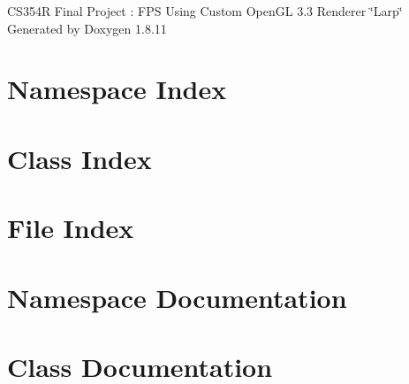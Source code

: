 \documentclass[twoside]{book}
\newcommand{\+}{\discretionary{\mbox{\scriptsize$\hookleftarrow$}}{}{}}
\newcommand{\clearemptydoublepage}{%
  \newpage{\pagestyle{empty}\cleardoublepage}%
}
\begin{document}
\hypersetup{pageanchor=false,
             bookmarksnumbered=true,
             pdfencoding=unicode
            }
\begin{titlepage}
\vspace*{7cm}
\begin{center}%
{\Large C\+S354R Final Project \+: F\+PS Using Custom Open\+GL 3.3 Renderer \char`\"{}\+Larp\char`\"{} }\\
\vspace*{1cm}
{\large Generated by Doxygen 1.8.11}\\
\end{center}
\end{titlepage}
\clearemptydoublepage
\tableofcontents
\clearemptydoublepage
{}
\hypersetup{pageanchor=true}

\chapter{Namespace Index}

\chapter{Class Index}

\chapter{File Index}

\chapter{Namespace Documentation}

\chapter{Class Documentation}





















\end{document}
